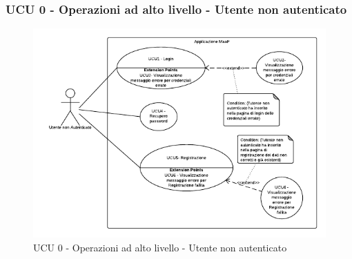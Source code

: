\subsubsection{UCU 0 - Operazioni ad alto livello - Utente non autenticato}    
    \begin{figure}[H]
      \begin{center}
      \includegraphics[width=12cm]{UML/UCU 0 - Operazioni ad alto livello - Utente non autenticato.png}
      \caption{UCU 0 - Operazioni ad alto livello - Utente non autenticato}
      \end{center} 
    \end{figure}    
    
